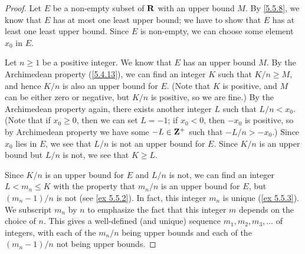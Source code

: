 \begin{proof}
  Let \(E\) be a non-empty subset of \(\mathbf{R}\) with an upper bound \(M\).
  By \cref{5.5.8}, we know that \(E\) has at most one least upper bound;
  we have to show that \(E\) has at least one least upper bound.
  Since \(E\) is non-empty, we can choose some element \(x_0\) in \(E\).

  Let \(n \geq 1\) be a positive integer.
  We know that \(E\) has an upper bound \(M\).
  By the Archimedean property (\cref{5.4.13}), we can find an integer \(K\) such that \(K / n \geq M\), and hence \(K / n\) is also an upper bound for \(E\).
  (Note that \(K\) is positive, and \(M\) can be either zero or negative, but \(K / n\) is positive, so we are fine.)
  By the Archimedean property again, there exists another integer \(L\) such that \(L / n < x_0\).
  (Note that if \(x_0 \geq 0\), then we can set \(L = -1\); if \(x_0 < 0\), then \(-x_0\) is positive, so by Archimedean property we have some \(-L \in \mathbf{Z}^+\) such that \(-L / n > -x_0\).)
  Since \(x_0\) lies in \(E\), we see that \(L / n\) is not an upper bound for \(E\).
  Since \(K / n\) is an upper bound but \(L / n\) is not, we see that \(K \geq L\).

  Since \(K / n\) is an upper bound for \(E\) and \(L / n\) is not, we can find an integer \(L < m_n \leq K\) with the property that \(m_n / n\) is an upper bound for \(E\), but \((m_n - 1) / n\) is not (see \cref{ex 5.5.2}).
  In fact, this integer \(m_n\) is unique (\cref{ex 5.5.3}).
  We subscript \(m_n\) by \(n\) to emphasize the fact that this integer \(m\) depends on the choice of \(n\).
  This gives a well-defined (and unique) sequence \(m_1, m_2, m_3, \dots\) of integers, with each of the \(m_n / n\) being upper bounds and each of the \((m_n - 1) / n\) not being upper bounds.


\end{proof}
